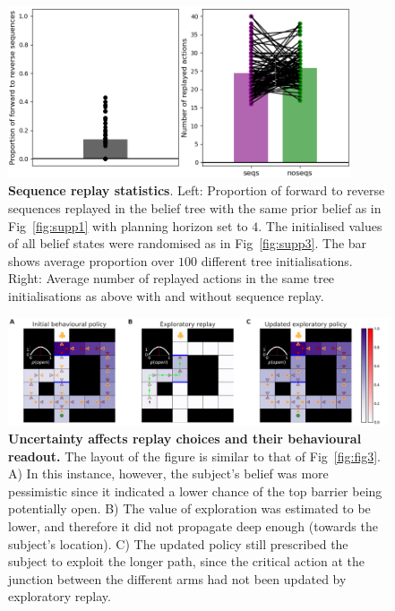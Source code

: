 \begin{figure}[h!]
    \centering
    \includegraphics[width=0.9\textwidth]{Figures/supp/supp4.png}
    \caption{\textbf{Sequence replay statistics}. Left: Proportion of forward to reverse sequences replayed in the belief tree with the same prior belief as in Fig~\ref{fig:supp1} with planning horizon set to $4$. The initialised values of all belief states were randomised as in Fig~\ref{fig:supp3}. The bar shows average proportion over $100$ different tree initialisations. Right: Average number of replayed actions in the same tree initialisations as above with and without sequence replay.}
    \label{fig:supp4}
\end{figure}

\begin{figure}[h!]
    \centering
    \includegraphics[width=1\textwidth]{Figures/supp/supp5.png}
    \caption{\textbf{Uncertainty affects replay choices and their behavioural readout.} The layout of the figure is similar to that of Fig~\ref{fig:fig3}. A) In this instance, however, the subject's belief was more pessimistic since it indicated a lower chance of the top barrier being potentially open. B) The value of exploration was estimated to be lower, and therefore it did not propagate deep enough (towards the subject's location). C) The updated policy still prescribed the subject to exploit the longer path, since the critical action at the junction between the different arms had not been updated by exploratory replay.}
    \label{fig:supp5}
\end{figure}

